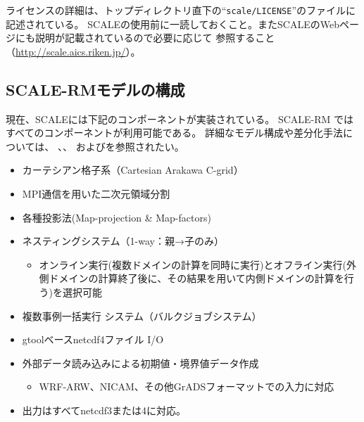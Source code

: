 ライセンスの詳細は、トップディレクトリ直下の``\verb|scale/LICENSE|''のファイルに記述されている。
SCALEの使用前に一読しておくこと。またSCALEのWebページにも説明が記載されているので必要に応じて
参照すること（\url{http://scale.aics.riken.jp/}）。



\subsection{SCALE-RMモデルの構成}
現在、SCALEには下記のコンポーネントが実装されている。
SCALE-RM ではすべてのコンポーネントが利用可能である。
詳細なモデル構成や差分化手法については、
\citet{scale_2015}、\citet{satoy_2015b}、
および\citet{nishizawa_2015}を参照されたい。\\


\begin{itemize}
 \item カーテシアン格子系（Cartesian Arakawa C-grid）
 \item MPI通信を用いた二次元領域分割
 \item 各種投影法(Map-projection \& Map-factors)
 \item ネスティングシステム（1-way：親→子のみ）
   \begin{itemize}
    \item オンライン実行(複数ドメインの計算を同時に実行)とオフライン実行(外側ドメインの計算終了後に、その結果を用いて内側ドメインの計算を行う)を選択可能
   \end{itemize}
 \item 複数事例一括実行 システム（バルクジョブシステム）
 \item gtoolベースnetcdf4ファイル I/O
 \item 外部データ読み込みによる初期値・境界値データ作成
   \begin{itemize}
    \item WRF-ARW、NICAM、その他GrADSフォーマットでの入力に対応
   \end{itemize}
 \item 出力はすべてnetcdf3または4に対応。
\end{itemize}

